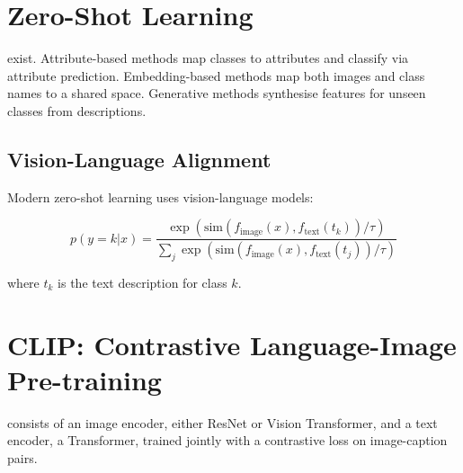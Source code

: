 

\section{Zero-Shot Learning}


 exist. Attribute-based methods map classes to attributes and classify via attribute prediction. Embedding-based methods map both images and class names to a shared space. Generative methods synthesise features for unseen classes from descriptions.

\subsection{Vision-Language Alignment}

Modern zero-shot learning uses vision-language models:

\begin{equation}
    p(y = k | x) = \frac{\exp(\text{sim}(f_{\text{image}}(x), f_{\text{text}}(t_k)) / \tau)}{\sum_j \exp(\text{sim}(f_{\text{image}}(x), f_{\text{text}}(t_j)) / \tau)}
\end{equation}

where $t_k$ is the text description for class $k$.


\section{CLIP: Contrastive Language-Image Pre-training}


 consists of an image encoder, either ResNet or Vision Transformer, and a text encoder, a Transformer, trained jointly with a contrastive loss on image-caption pairs.

